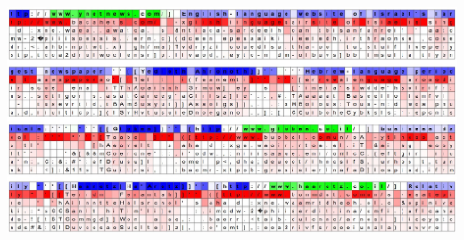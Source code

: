 \documentclass{beamer}
\newcommand{\Cite}[1]{{\footnotesize \citep{#1}}}
\begin{document}








\begin{frame}
  \begin{center}
    \includegraphics[width=\textwidth]{lstm1}

     \Cite{karpathy2015visualizing}
  \end{center}
\end{frame}
\end{document}
